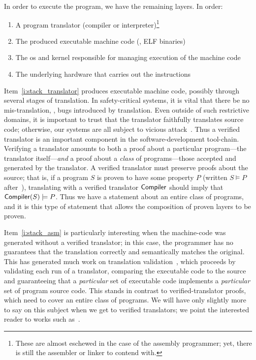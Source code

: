 In order to execute the program, we have the remaining layers. In order:
\begin{enumerate}
    \item\label{i:stack_translator} A program translator (compiler or
        interpreter)\footnote{These are almost eschewed in the case of the
        assembly programmer; yet, there is still the assembler or linker to
        contend with.}
    \item\label{i:stack_asm} The produced executable machine code (\eg, ELF
        binaries)
    \item\label{i:stack_OS} The \gls{os} and kernel responsible for managing execution
        of the machine code
    \item\label{i:stack_hardware} The underlying hardware that carries out the
        instructions
\end{enumerate}

Item~\ref{i:stack_translator} produces executable machine code, possibly through
several stages of translation. In safety-critical systems, it is vital that
there be no mis-translation, \ie, bugs introduced by translation. Even outside
of such restrictive domains, it is important to trust that the translator
faithfully translates source code; otherwise, our systems are all subject to
vicious attack~\cite{Thompson_1984}. Thus a verified translator is an important
component in the software-development tool-chain. Verifying a translator amounts
to both a proof about a particular program---the translator itself---\emph{and}
a proof about a \emph{class} of programs---those accepted and generated by the
translator. A verified translator must preserve proofs about the source; that
is, if a program \(S\) is proven to have some property \(P\) (written \(S
\models P\) after~\cite{Leroy-Compcert-CACM}), translating with a verified
translator \(\mathsf{Compiler}\) should imply that \(\mathsf{Compiler}(S) \models
P\). Thus we have a statement about an entire class of programs, and it is this
type of statement that allows the composition of proven layers to be proven.

Item~\ref{i:stack_asm} is particularly interesting when the machine-code was
generated without a verified translator; in this case, the programmer has no
guarantees that the translation correctly and semantically matches the original.
This has generated much work on translation validation~\cite{Pnueli_1998}, which
proceeds by validating each run of a translator, comparing the executable code
to the source and guaranteeing that a \emph{particular} set of executable code
implements a \emph{particular} set of program source code. This stands in
contrast to verified-translator proofs, which need to cover an entire class of
programs. We will have only slightly more to say on this subject when we get to
verified translators; we point the interested reader to works such
as~\cite{Sewell:phd,Sewell_KH_16,Sewell_2013,Necula_2000}.

